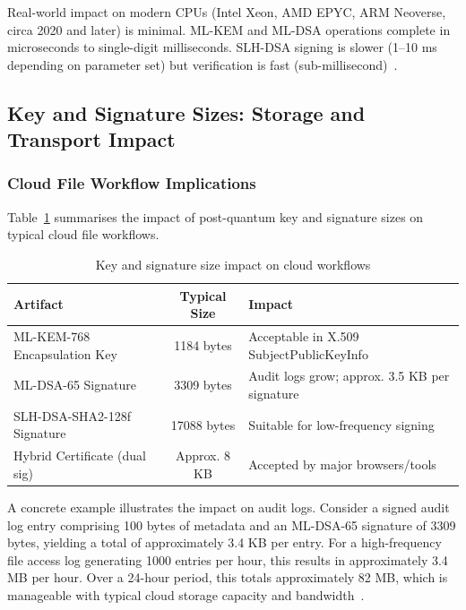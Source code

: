 \documentclass[12pt,a4paper]{article}
\begin{document}
Real-world impact on modern CPUs (Intel Xeon, AMD EPYC, ARM Neoverse, circa 2020 and later) is minimal. ML-KEM and ML-DSA operations complete in microseconds to single-digit milliseconds. SLH-DSA signing is slower (1–10 ms depending on parameter set) but verification is fast (sub-millisecond)~\cite{nist-fips-203-2024,nist-fips-204-2024,nist-fips-205-2024}.

\subsection{Key and Signature Sizes: Storage and Transport Impact}

\subsubsection{Cloud File Workflow Implications}

Table~\ref{tab:size-impact} summarises the impact of post-quantum key and signature sizes on typical cloud file workflows.

\begin{table}[htbp]
\centering
\caption{Key and signature size impact on cloud workflows}
\label{tab:size-impact}
\begin{tabular}{lcp{6cm}}
\toprule
\textbf{Artifact} & \textbf{Typical Size} & \textbf{Impact} \\
\midrule
ML-KEM-768 Encapsulation Key & 1184 bytes & Acceptable in X.509 SubjectPublicKeyInfo \\
ML-DSA-65 Signature & 3309 bytes & Audit logs grow; approx. 3.5 KB per signature \\
SLH-DSA-SHA2-128f Signature & 17088 bytes & Suitable for low-frequency signing \\
Hybrid Certificate (dual sig) & Approx. 8 KB & Accepted by major browsers/tools \\
\bottomrule
\end{tabular}
\end{table}

A concrete example illustrates the impact on audit logs. Consider a signed audit log entry comprising 100 bytes of metadata and an ML-DSA-65 signature of 3309 bytes, yielding a total of approximately 3.4 KB per entry. For a high-frequency file access log generating 1000 entries per hour, this results in approximately 3.4 MB per hour. Over a 24-hour period, this totals approximately 82 MB, which is manageable with typical cloud storage capacity and bandwidth~\cite{nist-fips-204-2024}.
\end{document}
